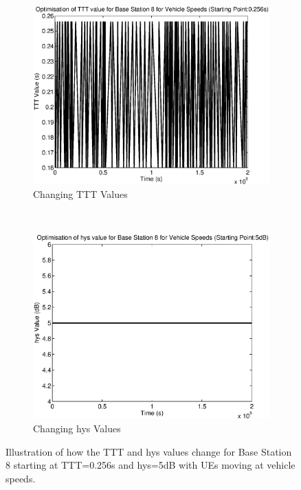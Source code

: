 \begin{figure}[H]
        \centering
        \begin{subfigure}[b]{0.49\textwidth}
                \includegraphics[width=\textwidth]{figures/graphs/vehmid/TTT8.eps}
                \caption{Changing TTT Values}
        \end{subfigure}%
        ~ %
        \begin{subfigure}[b]{0.49\textwidth}
                \includegraphics[width=\textwidth]{figures/graphs/vehmid/hys8.eps}
                \caption{Changing hys Values}
        \end{subfigure}
        \caption{Illustration of how the TTT and hys values change for Base Station 8 starting at TTT=0.256s and hys=5dB with UEs moving at vehicle speeds.}
\end{figure}
